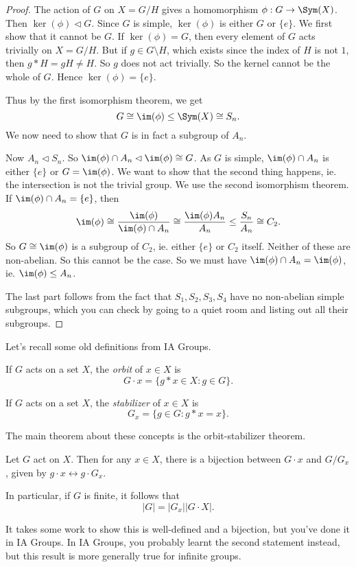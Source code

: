 \documentclass[a4paper]{article}
\begin{document}
\begin{proof}
  The action of $G$ on $X = G/H$ gives a homomorphism $\phi: G \to \Sym(X)$. Then $\ker(\phi) \lhd G$. Since $G$ is simple, $\ker(\phi)$ is either $G$ or $\{e\}$. We first show that it cannot be $G$. If $\ker(\phi) = G$, then every element of $G$ acts trivially on $X = G/H$. But if $g \in G\setminus H$, which exists since the index of $H$ is not $1$, then $g * H = gH \not= H$. So $g$ does not act trivially. So the kernel cannot be the whole of $G$. Hence $\ker(\phi) = \{e\}$.

  Thus by the first isomorphism theorem, we get
  \[
    G \cong \im (\phi) \leq \Sym(X) \cong S_n.
  \]
  We now need to show that $G$ is in fact a subgroup of $A_n$.

  Now $A_n \lhd S_n$. So $\im(\phi) \cap A_n \lhd \im(\phi) \cong G$. As $G$ is simple, $\im (\phi) \cap A_n$ is either $\{e\}$ or $G = \im(\phi)$. We want to show that the second thing happens, ie. the intersection is not the trivial group. We use the second isomorphism theorem. If $\im(\phi) \cap A_n = \{e\}$, then
  \[
    \im(\phi) \cong \frac{\im(\phi)}{\im(\phi) \cap A_n} \cong \frac{\im (\phi) A_n}{A_n} \leq \frac{S_n}{A_n} \cong C_2.
  \]
  So $G \cong \im (\phi)$ is a subgroup of $C_2$, ie. either $\{e\}$ or $C_2$ itself. Neither of these are non-abelian. So this cannot be the case. So we must have $\im(\phi) \cap A_n = \im(\phi)$, ie. $\im (\phi) \leq A_n$.

  The last part follows from the fact that $S_1, S_2, S_3, S_4$ have no non-abelian simple subgroups, which you can check by going to a quiet room and listing out all their subgroups.
\end{proof}

Let's recall some old definitions from IA Groups.
\begin{defi}[Orbit]
  If $G$ acts on a set $X$, the \emph{orbit} of $x \in X$ is
  \[
    G\cdot x = \{g * x \in X: g \in G\}.
  \]
\end{defi}

\begin{defi}[Stabilizer]
  If $G$ acts on a set $X$, the \emph{stabilizer} of $x \in X$ is
  \[
    G_x = \{g \in G: g * x = x\}.
  \]
\end{defi}

The main theorem about these concepts is the orbit-stabilizer theorem.
\begin{thm}
  Let $G$ act on $X$. Then for any $x \in X$, there is a bijection between $G\cdot x$ and $G/G_x$, given by $g \cdot x \leftrightarrow g\cdot G_x$.

  In particular, if $G$ is finite, it follows that
  \[
    |G| = |G_x| |G \cdot X|.
  \]
\end{thm}
It takes some work to show this is well-defined and a bijection, but you've done it in IA Groups. In IA Groups, you probably learnt the second statement instead, but this result is more generally true for infinite groups.
\end{document}
